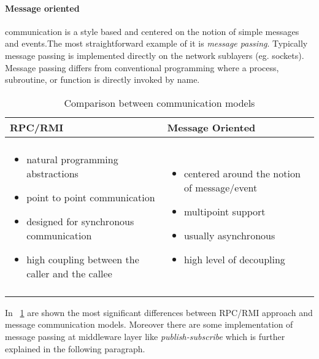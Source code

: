 \paragraph{Message oriented} communication is a style based and centered on the notion of simple messages and events.The most straightforward example of it is \textit{message passing}. Typically message passing is implemented directly on the network sublayers (eg. sockets). Message passing differs from conventional programming where a process, subroutine, or function is directly invoked by name. 
\begin{table}[h]
	\caption{Comparison between communication models}
	\label{tab:comp}
	\centering
	\begin{tabular}{p{}p{}}
		\toprule
		\textbf{RPC/RMI} & \textbf{Message Oriented} \\
		\midrule
		& \\
	      \begin{minipage}[t]{0.45\textwidth}
	     	\begin{itemize}
	     		\item natural programming abstractions
	     		\item point to point communication
	     		\item designed for synchronous communication
	     		\item high coupling between the caller and the callee
	     	\end{itemize}
	     \end{minipage} &  \begin{minipage}[t]{0.45\textwidth}
	     \begin{itemize}
	     	\item centered around the notion of message/event
	     	\item multipoint support
	     	\item usually asynchronous
	     	\item high level of decoupling
	     \end{itemize}
     \end{minipage} \\
  & \\
		
		\bottomrule
	\end{tabular}
\end{table}
In \tablename~\ref{tab:comp} are shown the most significant differences between RPC/RMI approach and message communication models. Moreover there are some implementation of message passing at middleware layer like \textit{publish-subscribe} which is further explained in the following paragraph.

